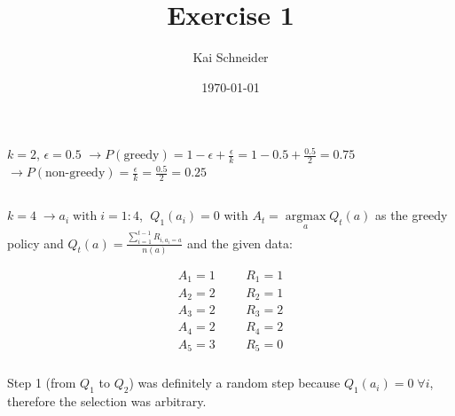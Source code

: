 \documentclass[11pt,a4paper]{article}
\title{Exercise 1}
\author{Kai Schneider}
\date{\today}
\begin{document}
 

\maketitle

\section{}

\subsection{}

$k = 2$, $\epsilon=0.5$ \newline
$\rightarrow P(\textrm{greedy})=1-\epsilon+\frac{\epsilon}{k}=1-0.5+\frac{0.5}{2}=0.75$ \newline
$\rightarrow P(\textrm{non-greedy})=\frac{\epsilon}{k}=\frac{0.5}{2}=0.25$

\subsection{}

$k=4 \; \rightarrow a_{i} \; \textrm{with} \; i=1:4$,  $\; Q_{1}(a_{i})=0$ \newline
with $A_{t}=\underset{a}{\operatorname{argmax}}Q_{t}(a)$ as the greedy policy and 
$Q_{t}(a)=\frac{\sum\limits_{i=1}^{t-1} R_{i,a_{i}=a}}{n(a)}$ and the given data:\newline

\begin{align*}
    A_{1}=1 \;\;\;\;\;\; & R_{1}=1 \\
    A_{2}=2 \;\;\;\;\;\; & R_{2}=1 \\
    A_{3}=2 \;\;\;\;\;\; & R_{3}=2 \\
    A_{4}=2 \;\;\;\;\;\; & R_{4}=2 \\
    A_{5}=3 \;\;\;\;\;\; & R_{5}=0
\end{align*}

\subsubsection{}

Step 1 (from $Q_{1}$ to $Q_{2}$) was definitely a random step because $Q_{1}(a_{i})=0 \; \forall i$, therefore the selection was arbitrary.
\end{document}
